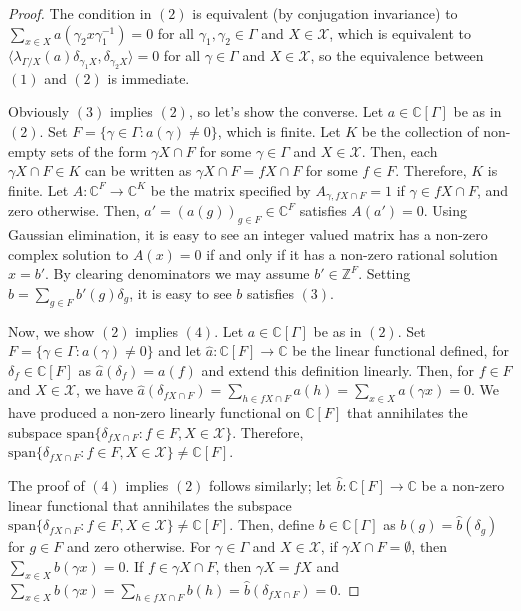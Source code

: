 \documentclass[a4paper, 12pt]{amsart}
\theoremstyle{definition}
\theoremstyle{remark}
\numberwithin{equation}{section}
\begin{document}
\begin{proof}
The condition in $(2)$ is equivalent (by conjugation invariance) to $\sum_{x\in X}a(\gamma_{2} x \gamma^{-1}_{1}) = 0$ for all $\gamma_{1},\gamma_{2}\in \Gamma$ and $X\in\mathcal{X}$, which is equivalent to $\langle \lambda_{\Gamma/X}(a)\delta_{\gamma_{1}X},\delta_{\gamma_{2} X}\rangle = 0 $ for all $\gamma\in\Gamma$ and $X\in\mathcal{X}$, so the equivalence between $(1)$ and $(2)$ is immediate.

Obviously $(3)$ implies $(2)$, so let's show the converse. Let $a\in\mathbb{C}[\Gamma]$ be as in $(2)$. Set $F = \{\gamma\in \Gamma: a(\gamma)\neq 0\}$, which is finite. Let $K$ be the collection of non-empty sets of the form $\gamma X\cap F$ for some $\gamma\in \Gamma$ and $X\in\mathcal{X}$. Then, each $\gamma X\cap F\in K$ can be written as $\gamma X\cap F = fX\cap F$ for some $f\in F$. Therefore, $K$ is finite. Let $A:\mathbb{C}^{F}\to \mathbb{C}^{K}$ be the matrix specified by $A_{\gamma, fX\cap F} = 1$ if $\gamma\in fX\cap F$, and zero otherwise. Then, $a' = (a(g))_{g\in F}\in\mathbb{C}^{F}$ satisfies $A(a') = 0$. Using Gaussian elimination, it is easy to see an integer valued matrix has a non-zero complex solution to $A(x) = 0$ if and only if it has a non-zero rational solution $x = b'$. By clearing denominators we may assume $b'\in \mathbb{Z}^{F}$. Setting $b = \sum_{g\in F}b'(g)\delta_{g}$, it is easy to see $b$ satisfies $(3)$. 

Now, we show $(2)$ implies $(4)$. Let $a\in\mathbb{C}[\Gamma]$ be as in $(2)$. Set $F = \{\gamma\in \Gamma: a(\gamma)\neq 0\}$ and let $\hat{a}:\mathbb{C}[F]\to\mathbb{C}$ be the linear functional defined, for $\delta_{f}\in \mathbb{C}[F]$ as $\hat{a}(\delta_{f}) = a(f)$ and extend this definition linearly. Then, for $f\in F$ and $X\in\mathcal{X}$, we have $\hat{a}(\delta_{fX\cap F}) = \sum_{h\in fX\cap F}a(h) = \sum_{x\in X}a(\gamma x) = 0$. We have produced a non-zero linearly functional on $\mathbb{C}[F]$ that annihilates the subspace $\text{span}\{\delta_{fX\cap F}: f\in F,X\in\mathcal{X}\}$. Therefore, $\text{span}\{\delta_{fX\cap F}: f\in F,X\in\mathcal{X}\}\neq \mathbb{C}[F]$.

    The proof of $(4)$ implies $(2)$ follows similarly; let $\hat{b}:\mathbb{C}[F]\to \mathbb{C}$ be a non-zero linear functional that annihilates the subspace $\text{span}\{\delta_{fX\cap F}: f\in F,X\in\mathcal{X}\}\neq \mathbb{C}[F]$. Then, define $b\in\mathbb{C}[\Gamma]$ as $b(g) = \hat{b}(\delta_{g})$ for $g\in F$ and zero otherwise. For $\gamma\in \Gamma$ and $X\in\mathcal{X}$, if $\gamma X\cap F = \emptyset$, then $\sum_{x\in X}b(\gamma x) = 0$. If $f\in \gamma X\cap F$, then $\gamma X = f X$ and $\sum_{x\in X}b(\gamma x) = \sum_{h\in f X\cap F}b(h) = \hat{b}(\delta_{fX\cap F}) = 0$.
\end{proof}
\end{document}
